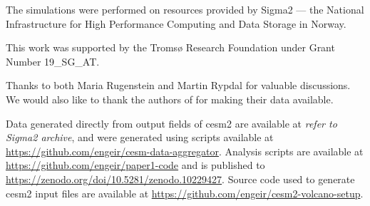 \documentclass{ametsocV6.1}
\begin{document}
\clearpage
\acknowledgments{}

The simulations were performed on resources provided by Sigma2 --- the National
Infrastructure for High Performance Computing and Data Storage in Norway.

This work was supported by the Tromsø Research Foundation under Grant Number 19\_SG\_AT.

Thanks to both Maria Rugenstein and Martin Rypdal for valuable discussions. We would
also like to thank the authors of \citet{gregory2016, ottobliesner2016,
  marshall2020dataset} for making their data available.

%
%
\datastatement{}

Data generated directly from output fields of \gls{cesm2} are available at \emph{refer
  to Sigma2 archive}, and were generated using scripts available at
\url{https://github.com/engeir/cesm-data-aggregator}. Analysis scripts are available at
\url{https://github.com/engeir/paper1-code} and is published to
\url{https://zenodo.org/doi/10.5281/zenodo.10229427}. Source code used to generate
\gls{cesm2} input files are available at
\url{https://github.com/engeir/cesm2-volcano-setup}.
\end{document}
